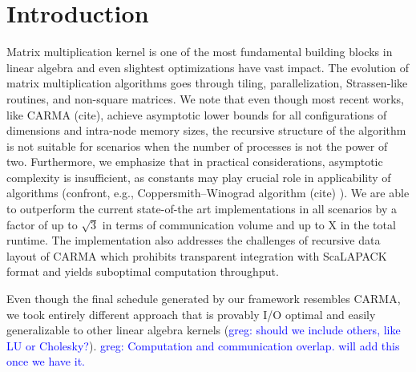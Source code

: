 \documentclass[sigconf]{acmart}
\newcommand\greg[1]{\textcolor{blue}{greg: #1}}
\begin{document}
	
	
	\section{Introduction}
	Matrix multiplication kernel is one of the most fundamental building blocks 
	in linear algebra and even slightest optimizations have vast impact. The 
	evolution of matrix multiplication algorithms goes through tiling, 
	parallelization, Strassen-like routines, and non-square matrices. We note 
	that even though most recent works, like CARMA (cite), achieve asymptotic 
	lower bounds for all configurations of dimensions and intra-node memory 
	sizes, the recursive structure of the algorithm is not suitable for 
	scenarios when the number of processes is not the power of two. 
	Furthermore, we emphasize that in practical considerations, asymptotic 
	complexity is insufficient, as constants may play crucial role in 
	applicability of algorithms (confront, e.g., Coppersmith–Winograd algorithm 
	(cite) ). We are able to outperform the current state-of-the art 
	implementations in all scenarios by a factor of up to $\sqrt{3}$ in terms 
	of communication volume and up to X in the total runtime. The 
	implementation 
	also addresses the challenges of recursive data layout of CARMA which 
	prohibits transparent integration with ScaLAPACK format and yields 
	suboptimal computation throughput.
	
	Even though the final schedule generated by our framework resembles CARMA, 
	we took entirely different approach that is provably I/O optimal and easily 
	generalizable to other linear algebra kernels (\greg{should we include 
	others, like LU or Cholesky?}).
 \greg{Computation and communication overlap. will add this once we have it.}
	
\end{document}
